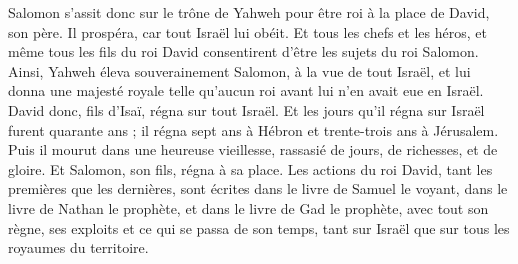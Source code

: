 \begin{multicols}{2}
Salomon s'assit donc sur le trône de Yahweh pour être roi à la place de David, son père. Il prospéra, car tout Israël lui obéit.
Et tous les chefs et les héros, et même tous les fils du roi David consentirent d'être les sujets du roi Salomon.
Ainsi, Yahweh éleva souverainement Salomon, à la vue de tout Israël, et lui donna une majesté royale telle qu'aucun roi avant lui n'en avait eue en Israël.
David donc, fils d'Isaï, régna sur tout Israël.
Et les jours qu'il régna sur Israël furent quarante ans ; il régna sept ans à Hébron et trente-trois ans à Jérusalem.
Puis il mourut dans une heureuse vieillesse, rassasié de jours, de richesses, et de gloire. Et Salomon, son fils, régna à sa place.
Les actions du roi David, tant les premières que les dernières, sont écrites dans le livre de Samuel le voyant, dans le livre de Nathan le prophète, et dans le livre de Gad le prophète,
avec tout son règne, ses exploits et ce qui se passa de son temps, tant sur Israël que sur tous les royaumes du territoire.
\PPE{}
\end{multicols}
